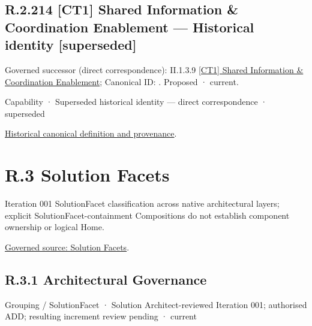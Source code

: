 \section*{R.2.214 [CT1] Shared Information \& Coordination Enablement — Historical identity [superseded]}
\label{navigation:R.2.214}

{\small Governed successor (direct correspondence): II.1.3.9 \hyperref[element:0062fcacae1740988b6be2bda2aa1674]{[CT1] Shared Information \& Coordination Enablement}; Canonical ID: \texttt{}. Proposed · current.}\par
\label{element:eeabb9c3c526404cbe4302906560fa7e}
{\small Capability · Superseded historical identity — direct correspondence · superseded}\par
\href{../../../../../../../continuum/strategy/capability/eeabb9c3c526404cbe4302906560fa7e.md}{Historical canonical definition and provenance}.\par
\chapter*{R.3 Solution Facets}
\label{navigation:R.3}

Iteration 001 SolutionFacet classification across native architectural layers; explicit SolutionFacet-containment Compositions do not establish component ownership or logical Home.\par
\href{../../../../../../offline-design/Harmoni-NFR-Derived Architetural Elements - Iteration 001.md}{Governed source: Solution Facets}.\par
\section*{R.3.1 Architectural Governance}
\label{navigation:R.3.1}

\label{element:03cfbc2cac494fb9a15106c2c571d384}
{\small Grouping / SolutionFacet · Solution Architect-reviewed Iteration 001; authorised ADD; resulting increment review pending · current}\par

